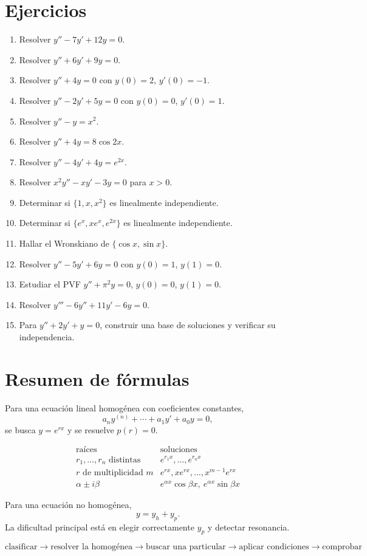 \documentclass[11pt]{article}
\theoremstyle{definition}
\begin{document}
\section{Ejercicios}
\begin{enumerate}
\item Resolver $y''-7y'+12y=0$.
\item Resolver $y''+6y'+9y=0$.
\item Resolver $y''+4y=0$ con $y(0)=2$, $y'(0)=-1$.
\item Resolver $y''-2y'+5y=0$ con $y(0)=0$, $y'(0)=1$.
\item Resolver $y''-y=x^2$.
\item Resolver $y''+4y=8\cos2x$.
\item Resolver $y''-4y'+4y=e^{2x}$.
\item Resolver $x^2y''-xy'-3y=0$ para $x>0$.
\item Determinar si $\{1,x,x^2\}$ es linealmente independiente.
\item Determinar si $\{e^x,xe^x,e^{2x}\}$ es linealmente independiente.
\item Hallar el Wronskiano de $\{\cos x,\sin x\}$.
\item Resolver $y''-5y'+6y=0$ con $y(0)=1$, $y(1)=0$.
\item Estudiar el PVF $y''+\pi^2y=0$, $y(0)=0$, $y(1)=0$.
\item Resolver $y'''-6y''+11y'-6y=0$.
\item Para $y''+2y'+y=0$, construir una base de soluciones y verificar su independencia.
\end{enumerate}

\section*{Resumen de fórmulas}

Para una ecuación lineal homogénea con coeficientes constantes,
\[
a_ny^{(n)}+\cdots+a_1y'+a_0y=0,
\]
se busca $y=e^{rx}$ y se resuelve $p(r)=0$.

\[
\begin{array}{c|c}
\text{raíces} & \text{soluciones}\\
\hline
r_1,\ldots,r_n\text{ distintas} & e^{r_1x},\ldots,e^{r_nx}\\
r\text{ de multiplicidad }m & e^{rx},xe^{rx},\ldots,x^{m-1}e^{rx}\\
\alpha\pm i\beta & e^{\alpha x}\cos\beta x,\ e^{\alpha x}\sin\beta x
\end{array}
\]

Para una ecuación no homogénea,
\[
\boxed{y=y_h+y_p}.
\]
La dificultad principal está en elegir correctamente $y_p$ y detectar resonancia.

\[
\boxed{
\text{clasificar}
\longrightarrow
\text{resolver la homogénea}
\longrightarrow
\text{buscar una particular}
\longrightarrow
\text{aplicar condiciones}
\longrightarrow
\text{comprobar}
}
\]
\end{document}
